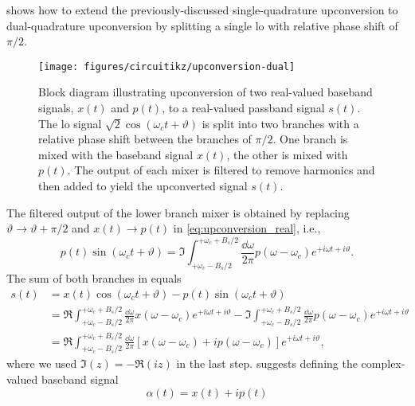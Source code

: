  shows how to extend the previously-discussed single-quadrature upconversion to dual-quadrature upconversion by splitting a single \gls{lo} with relative phase shift of $\pi/2$.
\begin{figure}[htb]
	\centering
	\texttt{[image: figures/circuitikz/upconversion-dual]}
	\caption{Block diagram illustrating upconversion of two real-valued baseband signals, $x(t)$ and $p(t)$, to a real-valued passband signal $s(t)$. The \gls{lo} signal $\sqrt{2}\cos(\omega_ct+\vartheta)$ is split into two branches with a relative phase shift between the branches of $\pi/2$. One branch is mixed with the baseband signal $x(t)$, the other is mixed with $p(t)$. The output of each mixer is filtered to remove harmonics and then added to yield the upconverted signal $s(t)$.}\label{fig:upconversion_dual}
\end{figure}
The filtered output of the lower branch mixer is obtained by replacing $\vartheta\to\vartheta+\pi/2$ and $x(t)\to p(t)$ in \cref{eq:upconversion_real}, i.e.,
\begin{equation}
	p(t)
	\sin(\omega_ct+\vartheta)
	=
	\Im
	\int_{+\omega_c-B_s/2}^{+\omega_c+B_s/2}
	\frac{\dd{\omega}}{2\pi}
	p(\omega-\omega_c)
	e^{+i\omega t+i\vartheta}
	.
	\label{eq:upconversion_real}
\end{equation}
The sum of both branches in  equals
\begin{equation}
	\begin{split}
		s(t)
		&=
		x(t)
		\cos(\omega_ct+\vartheta)
		-
		p(t)
		\sin(\omega_ct+\vartheta)
		\\
		&=
		\Re
		\int_{+\omega_c-B_s/2}^{+\omega_c+B_s/2}
		\frac{\dd{\omega}}{2\pi}
		x(\omega-\omega_c)
		e^{+i\omega t+i\vartheta}
		-
		\Im
		\int_{+\omega_c-B_s/2}^{+\omega_c+B_s/2}
		\frac{\dd{\omega}}{2\pi}
		p(\omega-\omega_c)
		e^{+i\omega t+i\vartheta}
		\\
		&=
		\Re
		\int_{+\omega_c-B_s/2}^{+\omega_c+B_s/2}
		\frac{\dd{\omega}}{2\pi}
		\left[
			x(\omega-\omega_c)
			+
			ip(\omega-\omega_c)
		\right]
		e^{+i\omega t+i\vartheta}
		,
	\end{split}
	\label{eq:upconversion_dual}
\end{equation}
where we used $\Im(z)=-\Re(iz)$ in the last step.
 suggests defining the complex-valued baseband signal
\begin{equation}
	\alpha(t)
	=
	x(t)
	+
	ip(t)
	\label{eq:upconversion_baseband}
\end{equation}
